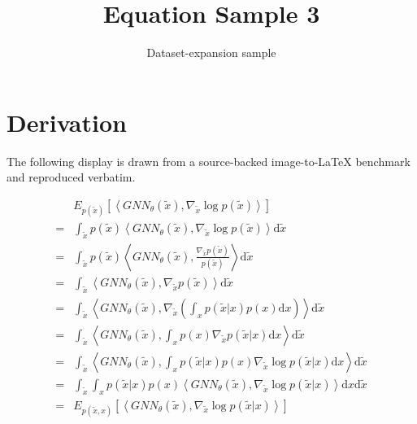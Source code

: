 \documentclass[11pt]{article}
\title{Equation Sample 3}
\author{Dataset-expansion sample}
\date{}
\begin{document}
\maketitle
\section{Derivation}
The following display is drawn from a source-backed image-to-LaTeX benchmark and reproduced verbatim.

\begin{equation*}
\begin{aligned}
&E_{p (\tilde{x})}[\left <GNN_{\theta} (\tilde{x}),\nabla _{\tilde{x}} \log p (\tilde{x})\right > ]\\
=& \int_{\tilde{x}} p (\tilde{x}) \left <GNN_{\theta} (\tilde{x}),\nabla _{\tilde{x}} \log p (\tilde{x})\right > \mathrm{d}\tilde{x} \\
=& \int_{\tilde{x}} p (\tilde{x}) \left <GNN_{\theta} (\tilde{x}),\frac{\nabla _{\tilde{x}} p (\tilde{x})}{p (\tilde{x})}\right > \mathrm{d}\tilde{x} \\
=& \int_{\tilde{x}} \left <GNN_{\theta} (\tilde{x}),\nabla _{\tilde{x}} p (\tilde{x})\right > \mathrm{d}\tilde{x} \\
=& \int_{\tilde{x}} \left<GNN_{\theta} (\tilde{x}),\nabla _{\tilde{x}} \left (\int_{x} p (\tilde{x}|x)p(x) \mathrm{d}x\right ) \right > \mathrm{d}\tilde{x} \\
=& \int_{\tilde{x}} \left <GNN_{\theta} (\tilde{x}), \int_{x} p(x) \nabla _{\tilde{x}} p (\tilde{x}|x) \mathrm{d}x \right > \mathrm{d}\tilde{x} \\
=& \int_{\tilde{x}} \left <GNN_{\theta} (\tilde{x}), \int_{x} p (\tilde{x}|x) p(x) \nabla _{\tilde{x}}\log p (\tilde{x}|x) \mathrm{d}x \right > \mathrm{d}\tilde{x} \\
=& \int_{\tilde{x}} \int_{x} p (\tilde{x}|x) p(x) \left <GNN_{\theta} (\tilde{x}), \nabla _{\tilde{x}}\log p (\tilde{x}|x) \right > \mathrm{d}x \mathrm{d}\tilde{x} \\
=& E_{p (\tilde{x},x)} [ \left <GNN_{\theta} (\tilde{x}), \nabla _{\tilde{x}}\log p (\tilde{x}|x) \right > ]\\
\end{aligned}
\end{equation*}
\end{document}
